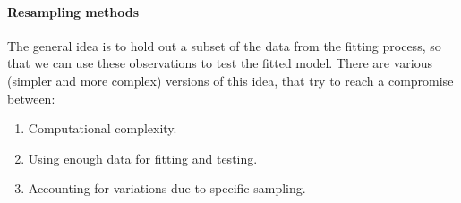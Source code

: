 \paragraph{Resampling methods} The general idea is to hold out a subset of the data from the fitting process, so that we can use these observations to test the fitted model. There are various (simpler and more complex) versions of this idea, that try to reach a compromise between:
\begin{enumerate}
    \item Computational complexity.
    \item Using enough data for fitting and testing.
    \item Accounting for variations due to specific sampling.
\end{enumerate}

